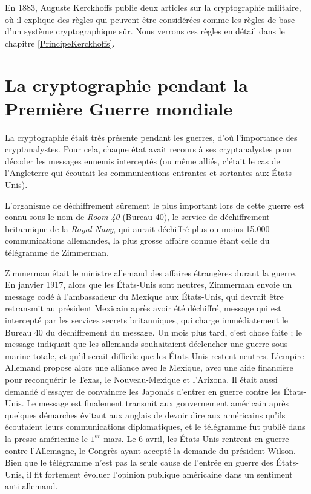 En 1883, Auguste Kerckhoffs publie deux articles sur la
cryptographie militaire, où il explique des règles qui peuvent être
considérées comme les règles de base d'un système cryptographique
sûr. Nous verrons ces règles en détail dans le chapitre
\ref{PrincipeKerckhoffs}. \\

\section{La cryptographie pendant la Première Guerre mondiale}
La cryptographie était très présente pendant les guerres, d'où
l'importance des cryptanalystes. Pour cela, chaque état avait recours
à ses cryptanalystes pour décoder les messages ennemis interceptés (ou
même alliés, c'était le cas de l'Angleterre qui écoutait les
communications entrantes et sortantes aux États-Unis).

L'organisme de déchiffrement sûrement le plus important lors de cette guerre
est connu sous le nom de \emph{Room 40} (Bureau 40), le service de
déchiffrement britannique de la \emph{Royal Navy}, qui aurait déchiffré
plus ou moins 15.000 communications allemandes, la plus grosse affaire
connue étant celle du télégramme de Zimmerman.

Zimmerman était le ministre allemand des affaires étrangères durant la
guerre. En janvier 1917, alors que les États-Unis sont neutres,
Zimmerman envoie un message codé à l'ambassadeur du Mexique aux
États-Unis, qui devrait être retransmit au président Mexicain après
avoir été déchiffré, message qui est intercepté par les services
secrets britanniques, qui charge immédiatement le Bureau 40 du
déchiffrement du message. Un mois plus tard, c'est chose faite ; le
message indiquait que les allemands souhaitaient déclencher une guerre
sous-marine totale, et qu'il serait difficile que les États-Unis
restent neutres. L'empire Allemand propose alors une alliance avec le
Mexique, avec une aide financière pour reconquérir le Texas, le
Nouveau-Mexique et l'Arizona. Il était aussi demandé d'essayer de
convaincre les Japonais d'entrer en guerre contre les États-Unis.
Le message est finalement transmit aux gouvernement américain après
quelques démarches évitant aux anglais de devoir dire aux américains
qu'ils écoutaient leurs communications diplomatiques, et le télégramme
fut publié dans la presse américaine le $1^{er}$ mars. Le 6 avril, les
États-Unis rentrent en guerre contre l'Allemagne, le Congrès ayant
accepté la demande du président Wilson. Bien que le télégramme n'est
pas la seule cause de l'entrée en guerre des États-Unis, il fit
fortement évoluer l'opinion publique américaine dans un sentiment
anti-allemand.

